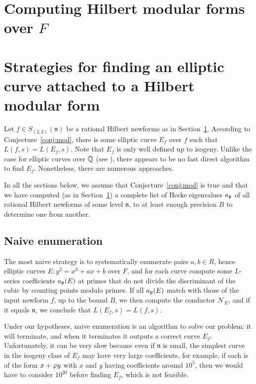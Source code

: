 \documentclass{amsart}
\newcommand{\n}{\mathfrak{n}}
\newcommand{\cN}{\mathcal{N}}
\begin{document}
\section{Computing Hilbert modular forms over $F$}\label{sec:hmf}



\section{Strategies for finding an elliptic curve attached to a Hilbert modular form}
Let $f\in S_{(2,2)}(\n)$ be a rational Hilbert newforms as in
Section~\ref{sec:hmf}.  According to Conjecture~\ref{conj:mod}, there
is some elliptic curve $E_f$ over $f$ such that $L(f,s) = L(E_f,s)$.
Note that $E_f$ is only well defined up to isogeny.  Unlike the case
for elliptic curves over $\mathbb{Q}$ (see \cite{cremona:algs}), there appears
to be no fast direct algorithm to find $E_f$.  Nonetheless, there are
numerous approaches.

In all the sections below, we assume that Conjecture~\ref{conj:mod} is
true and that we have computed (as in Section~\ref{sec:hmf}) a
complete list of Hecke eigenvalues $a_{\mathfrak{p}}$ of all rational Hilbert
newforms of some level $\n$, to at least enough precision $B$ to determine
one from another.

\subsection{Naive enumeration}\label{sec:naive}

The most naive strategy is to systematically enumerate pairs $a,b\in
R$, hence elliptic curves $E: y^2 = x^3 + ax + b$ over $F$, and for
each curve compute some $L$-series coefficients $a_{\mathfrak{p}}(E)$ at primes
that do not divide the discriminant of the cubic by counting points
modulo primes.  If all $a_{\mathfrak{p}}(E)$ match with those of the input newform
$f$, up to the bound $B$, we then compute the conductor $\cN_E$, and
if it equals $\n$, we conclude that $L(E_f,s) = L(f,s)$.

Under our hypotheses, naive enumeration is an algorithm to solve our
problem: it will terminate, and when it terminates it outputs a
correct curve $E_f$. Unfortunately, it can be very slow because even
if $\n$ is small, the simplest curve in the isogeny class of $E_f$ may
have very large coefficients, for example, if each is of the form
$x+\varphi y$ with $x$ and $y$ having coefficients around $10^5$, then
we would have to consider $10^{20}$ before finding $E_f$, which is not
feasible.
\end{document}
